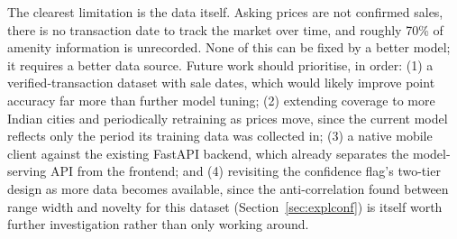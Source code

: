 \documentclass[12pt]{report}
\begin{document}
The clearest limitation is the data itself. Asking prices are not confirmed sales,
there is no transaction date to track the market over time, and roughly 70\% of
amenity information is unrecorded. None of this can be fixed by a better model; it
requires a better data source. Future work should prioritise, in order: (1) a
verified-transaction dataset with sale dates, which would likely improve point
accuracy far more than further model tuning; (2) extending coverage to more Indian
cities and periodically retraining as prices move, since the current model reflects
only the period its training data was collected in; (3) a native mobile client
against the existing FastAPI backend, which already separates the model-serving API
from the frontend; and (4) revisiting the confidence flag's two-tier design as more
data becomes available, since the anti-correlation found between range width and
novelty for this dataset (Section~\ref{sec:explconf}) is itself worth further
investigation rather than only working around.

\end{document}
